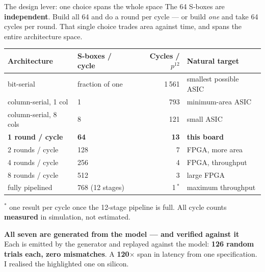 \documentclass[aspectratio=169,11pt]{beamer}
\begin{document}
\begin{frame}{The design lever: one choice spans the whole space}
{\small The 64 S-boxes are \textbf{independent}. Build all 64 and do a round per
cycle --- or build \emph{one} and take 64 cycles per round. That single choice
trades area against time, and spans the entire architecture space.}
\vspace{0.5mm}
\begin{center}
{\scriptsize\setlength{\tabcolsep}{5pt}\renewcommand{\arraystretch}{1.02}
\begin{tabular}{llrl}
\toprule
\textbf{Architecture} & \textbf{S-boxes / cycle} & \textbf{Cycles / $p^{12}$} & \textbf{Natural target}\\
\midrule
bit-serial              & fraction of one & 1\,561 & smallest possible ASIC\\
column-serial, 1 col    & 1               & 793   & minimum-area ASIC\\
column-serial, 8 cols   & 8               & 121   & small ASIC\\
\rowcolor{hwfill}
\textbf{1 round / cycle}& \textbf{64}     & \textbf{13} & \textbf{this board}\\
2 rounds / cycle        & 128             & 7     & FPGA, more area\\
4 rounds / cycle        & 256             & 4     & FPGA, throughput\\
8 rounds / cycle        & 512             & 3     & large FPGA\\
fully pipelined         & 768 (12 stages) & 1\,$^{*}$ & maximum throughput\\
\bottomrule
\end{tabular}}
\end{center}
\vspace{0.5mm}
{\scriptsize $^{*}$ one result per cycle once the 12-stage pipeline is full.
All cycle counts \textbf{measured} in simulation, not estimated.}
\vspace{1.5mm}

{\small\color{docblue}\textbf{All seven are generated from the model --- and verified against it}}\\
{\footnotesize Each is emitted by the generator and replayed against the model:
\textbf{126 random trials each, zero mismatches}. A \textbf{120$\times$} span in
latency from one specification. I realised the highlighted one on silicon.}
\end{frame}

\end{document}

